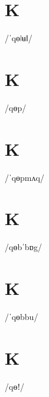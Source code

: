 \documentclass[10pt,a4paper,twoside]{book}
\begin{document}
\section*{K}

\begin{multicols}{3}
 {/ˈqɵǀʉǁ/} {}
\end{multicols}

\section*{K}

\begin{multicols}{3}
 {/qɵp/} {}
\end{multicols}

\section*{K}

\begin{multicols}{3}
 {/ˈqɵpmʌq/} {}
\end{multicols}

\section*{K}

\begin{multicols}{3}
 {/qɵbˈbɒg/} {}
\end{multicols}

\section*{K}

\begin{multicols}{3}
 {/ˈqɵbbu/} {}
\end{multicols}

\section*{K}

\begin{multicols}{3}
 {/qɵǃ/} {}
\end{multicols}
\end{document}
